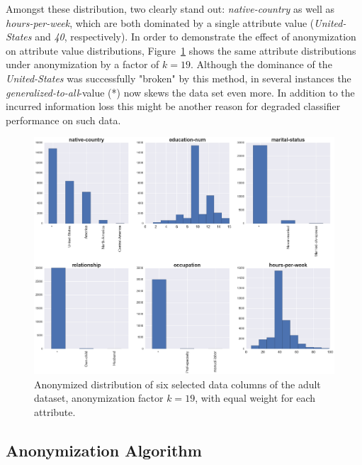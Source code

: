 \documentclass{llncs}
\begin{document}
Amongst these distribution, two clearly stand out: \textit{native-country} as well as \textit{hours-per-week}, which are both dominated by a single attribute value (\textit{United-States} and \textit{40}, respectively). In order to demonstrate the effect of anonymization on attribute value distributions, Figure~\ref{fig:adult_anonymized_distribution} shows the same attribute distributions under anonymization by a factor of $k=19$. Although the dominance of the \textit{United-States} was successfully "broken" by this method, in several instances the \textit{generalized-to-all}-value (*) now skews the data set even more. In addition to the incurred information loss this might be another reason for degraded classifier performance on such data.

\begin{figure}[H]
	\begin{center}
    	\hspace*{-0.8cm}
		\includegraphics[width=1.1\textwidth]{figures/theory/dist_anonym_small}
		\caption{Anonymized distribution of six selected data columns of the adult dataset, anonymization factor $k=19$, with equal weight for each attribute.}
		\label{fig:adult_anonymized_distribution}
	\end{center}
\end{figure}



\subsection{Anonymization Algorithm}
\label{ssect:algorithm}
\end{document}
